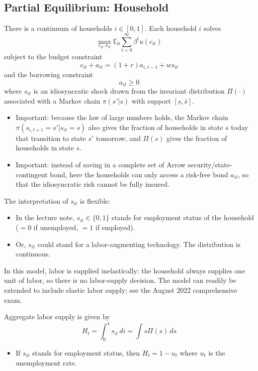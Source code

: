 \documentclass[12pt]{article}
\begin{document}
\subsection{Partial Equilibrium: Household}
There is a continuum of households $i \in [0,1]$. Each household $i$ solves
\begin{equation}
	\max_{c_{it}, a_{it}} \mathbb{E}_0 \sum_{t=0}^\infty \beta^t u(c_{it})
\end{equation}
subject to the budget constraint
\begin{equation}
	c_{it} + a_{it} = (1+r) a_{i,t-1} + ws_{it}
\end{equation}
and the borrowing constraint
\begin{equation}
	a_{it} \geq 0
\end{equation}
where $s_{it}$ is an idiosyncratic shock drawn from the invariant distribution $\Pi(\cdot)$ associated with a Markov chain $\pi(s'|s)$ with support $[\underline{s},\bar{s}]$. 
\begin{itemize}
	\item Important: because the law of large numbers holds, the Markov chain $\pi(s_{i,t+1} = s'|s_{it} = s)$ also gives the fraction of households in state $s$ today that transition to state $s'$ tomorrow, and $\Pi(s)$ gives the fraction of households in state $s$.
	\item Important: instead of saving in a complete set of Arrow security/state-contingent bond, here the households can only access a risk-free bond $a_{it}$, so that the idiosyncratic risk cannot be fully insured.
\end{itemize}
The interpretation of $s_{it}$ is flexible:
\begin{itemize}
	\item In the lecture note, $s_{it} \in \{0,1\}$ stands for employment status of the household ($=0$ if unemployed, $=1$ if employed).
	\item Or, $s_{it}$ could stand for a labor-augmenting technology. The distribution is continuous.
\end{itemize}
In this model, labor is supplied inelastically: the household always supplies one unit of labor, so there is no labor-supply decision. The model can readily be extended to include elastic labor supply; see the August 2022 comprehensive exam.

Aggregate labor supply is given by
\begin{equation}
	H_t = \int_0^1 s_{it} \,di = \int s \Pi(s) \,ds
\end{equation} 
\begin{itemize}
	\item If $s_{it}$ stands for employment status, then $H_t = 1-u_t$ where $u_t$ is the unemployment rate.
\end{itemize}
\end{document}
